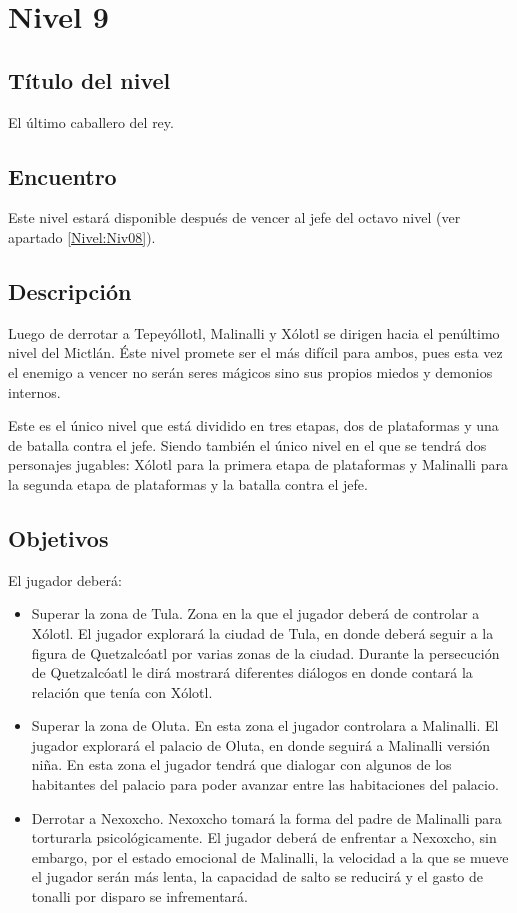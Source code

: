 	\section{Nivel 9} \label{Nivel:Niv09}
	\subsection{Título del nivel}
	El último caballero del rey.
	\subsection{Encuentro}
	Este nivel estará disponible después de vencer al jefe del octavo nivel (ver apartado \ref{Nivel:Niv08}).  
	\subsection{Descripción}
	Luego de derrotar a Tepeyóllotl, Malinalli y Xólotl se dirigen hacia el penúltimo nivel del Mictlán. Éste nivel promete ser el más difícil para ambos, pues esta vez el enemigo a vencer no serán seres mágicos sino sus propios miedos y demonios internos.
	\\
\par
Este es el único nivel que está dividido en tres etapas, dos de plataformas y una de batalla contra el jefe. Siendo también el único nivel en el que se tendrá dos personajes jugables: Xólotl para la primera etapa de plataformas y Malinalli para la segunda etapa de plataformas y la batalla contra el jefe.

	\subsection{Objetivos}
	El jugador deberá:	
	\begin{itemize}
		\item Superar la zona de Tula. Zona en la que el jugador deberá de controlar a Xólotl. El jugador explorará la ciudad de Tula, en donde deberá seguir a la figura de Quetzalcóatl por varias zonas de la ciudad. Durante la persecución de Quetzalcóatl le dirá mostrará diferentes diálogos en donde contará la relación que tenía con Xólotl.
		\item Superar la zona de Oluta. En esta zona el jugador controlara a Malinalli. El jugador explorará el palacio de Oluta, en donde seguirá a Malinalli versión niña. En esta zona el jugador tendrá que dialogar con algunos de los  habitantes del palacio para poder avanzar entre las habitaciones del palacio.
		\item Derrotar a Nexoxcho. Nexoxcho tomará la forma del padre de Malinalli para torturarla psicológicamente.  El jugador deberá de enfrentar a Nexoxcho, sin embargo, por el estado emocional de Malinalli, la velocidad a la que se mueve el jugador serán más lenta, la capacidad de salto se reducirá y el gasto de tonalli por disparo se infrementará.
	\end{itemize}
